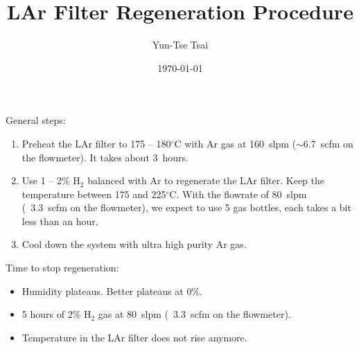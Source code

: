 \documentclass[letterpaper,11pt]{article}
\newcommand{\Hydro}     {H$_2$}
\newcommand{\dC}        {$^\circ$C}
\begin{document}
\title{\textbf{LAr Filter Regeneration Procedure}}
\author{Yun-Tse Tsai}
\date{\today}

\maketitle


General steps:
\begin{enumerate}
\setlength\itemsep{-0.2em}
\item Preheat the LAr filter to 175 -- 180{\dC} with Ar gas at 160~slpm ($\sim$6.7~scfm on the flowmeter).  It takes about 3~hours.
\item Use 1 -- 2\% {\Hydro} balanced with Ar to regenerate the LAr filter.  Keep the temperature between 175 and 225{\dC}.  With the flowrate of 80~slpm (~3.3~scfm on the flowmeter), we expect to use 5 gas bottles, each takes a bit less than an hour.
\item Cool down the system with ultra high purity Ar gas.
\end{enumerate}

Time to stop regeneration:
\begin{itemize}
\setlength\itemsep{-0.2em}
\item Humidity plateaus.  Better plateaus at 0\%.
\item 5 hours of 2\% {\Hydro} gas at 80~slpm (~3.3~scfm on the flowmeter).
\item Temperature in the LAr filter does not rise anymore.
\end{itemize}
\end{document}
